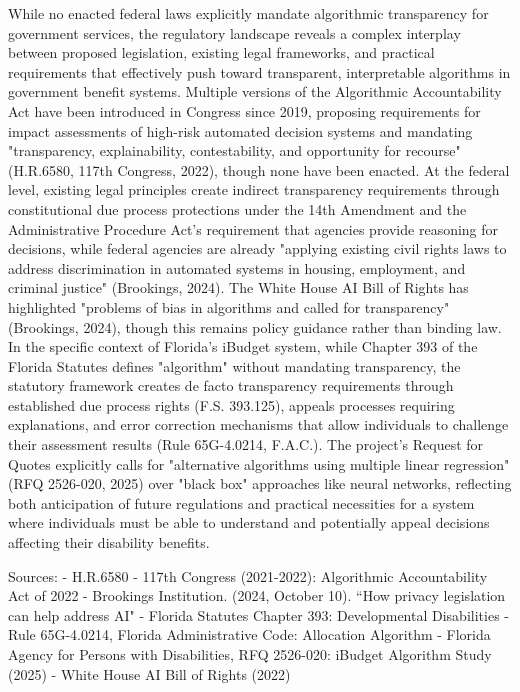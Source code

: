While no enacted federal laws explicitly mandate algorithmic transparency for government services, the regulatory landscape reveals a complex interplay between proposed legislation, existing legal frameworks, and practical requirements that effectively push toward transparent, interpretable algorithms in government benefit systems. Multiple versions of the Algorithmic Accountability Act have been introduced in Congress since 2019, proposing requirements for impact assessments of high-risk automated decision systems and mandating "transparency, explainability, contestability, and opportunity for recourse" (H.R.6580, 117th Congress, 2022), though none have been enacted. At the federal level, existing legal principles create indirect transparency requirements through constitutional due process protections under the 14th Amendment and the Administrative Procedure Act's requirement that agencies provide reasoning for decisions, while federal agencies are already "applying existing civil rights laws to address discrimination in automated systems in housing, employment, and criminal justice" (Brookings, 2024). The White House AI Bill of Rights has highlighted "problems of bias in algorithms and called for transparency" (Brookings, 2024), though this remains policy guidance rather than binding law. In the specific context of Florida's iBudget system, while Chapter 393 of the Florida Statutes defines "algorithm" without mandating transparency, the statutory framework creates de facto transparency requirements through established due process rights (F.S. 393.125), appeals processes requiring explanations, and error correction mechanisms that allow individuals to challenge their assessment results (Rule 65G-4.0214, F.A.C.). The project's Request for Quotes explicitly calls for "alternative algorithms using multiple linear regression" (RFQ 2526-020, 2025) over "black box" approaches like neural networks, reflecting both anticipation of future regulations and practical necessities for a system where individuals must be able to understand and potentially appeal decisions affecting their disability benefits.

Sources:
- H.R.6580 - 117th Congress (2021-2022): Algorithmic Accountability Act of 2022
- Brookings Institution. (2024, October 10). ``How privacy legislation can help address AI"
- Florida Statutes Chapter 393: Developmental Disabilities
- Rule 65G-4.0214, Florida Administrative Code: Allocation Algorithm
- Florida Agency for Persons with Disabilities, RFQ 2526-020: iBudget Algorithm Study (2025)
- White House AI Bill of Rights (2022)

